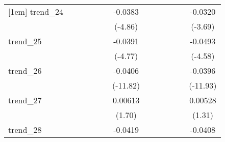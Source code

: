 {\begin{tabular}{l*{12}{c}}
[1em]
trend\_24    &                     &                     &                     &                     &                     &     -0.0383\sym{***}&                     &                     &                     &                     &                     &     -0.0320\sym{***}\\
            &                     &                     &                     &                     &                     &     (-4.86)         &                     &                     &                     &                     &                     &     (-3.69)         \\
[1em]
trend\_25    &                     &                     &                     &                     &                     &     -0.0391\sym{***}&                     &                     &                     &                     &                     &     -0.0493\sym{***}\\
            &                     &                     &                     &                     &                     &     (-4.77)         &                     &                     &                     &                     &                     &     (-4.58)         \\
[1em]
trend\_26    &                     &                     &                     &                     &                     &     -0.0406\sym{***}&                     &                     &                     &                     &                     &     -0.0396\sym{***}\\
            &                     &                     &                     &                     &                     &    (-11.82)         &                     &                     &                     &                     &                     &    (-11.93)         \\
[1em]
trend\_27    &                     &                     &                     &                     &                     &     0.00613         &                     &                     &                     &                     &                     &     0.00528         \\
            &                     &                     &                     &                     &                     &      (1.70)         &                     &                     &                     &                     &                     &      (1.31)         \\
[1em]
trend\_28    &                     &                     &                     &                     &                     &     -0.0419\sym{***}&                     &                     &                     &                     &                     &     -0.0408\sym{***}\\

\end{tabular}}
